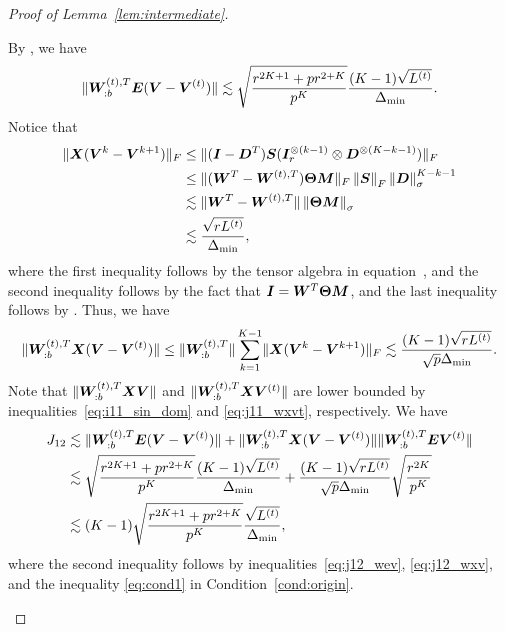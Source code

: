 \documentclass[lettersize,journal]{IEEEtran}
\theoremstyle{definition}
\theoremstyle{definition}
\begin{document}
\begin{proof}[Proof of Lemma~\ref{lem:intermediate}]
\begin{enumerate}
    By \citet[Proof of Lemma 5]{han2020exact}, we have 
    \begin{equation}\label{eq:j12_wev}
        \onormSize{}{\mW_{:b}^{(t),T} \mE (\mV-\mV^{(t)})} \lesssim \sqrt{ \frac{r^{2K+1} + p r^{2 + K}}{p^K} } \frac{(K-1)\sqrt{L^{(t)}}}{\Delta_{\min}}.
    \end{equation}
    Notice that 
    \begin{align}
        \lVert\bm X (\bm{V}^k-\bm{V}^{k+1})\rVert_F &\leq \lVert(\bm I - \bm{D}^T) \bm S (\bm I_r^{\otimes (k-1)} \otimes  \bm{D}^{\otimes (K-k-1)})\rVert_F \\
        &\leq \lVert(\bm{W}^T - \bm{W}^{(t),T}) \boldsymbol{\Theta} \bm M\rVert_F \left\lVert\bm S\right\rVert_F \left\lVert \bm{D}\right\rVert_{\sigma}^{K-k-1}\\
        & \lesssim \lVert \bm{W}^T - \bm{W}^{(t),T} \rVert \left\lVert\boldsymbol{\Theta} \bm M\right\rVert_{\sigma} \\
        & \lesssim \frac{ \sqrt{r L^{(t)}}}{\Delta_{\min}},
    \end{align}
    where the first inequality follows by the tensor algebra in equation~\label{eq:j11_inner}, and the second inequality follows by the fact  that $\bm I = \bm{W}^T \boldsymbol{\Theta} \bm M$, and the last inequality follows by \citet[Proof of Lemma 5]{han2020exact}. Thus, we have
    \begin{equation}
           \onormSize{}{\mW_{:b}^{(t),T} \mX (\mV-\mV^{(t)})}\leq \onormSize{}{\mW_{:b}^{(t),T} }  \sum_{k = 1}^{K-1} \onormSize{}{\mX (\mV^k-\mV^{k+1})}_F \lesssim \frac{ (K-1) \sqrt{r L^{(t)}}}{\sqrt{p} \Delta_{\min}}.\label{eq:j12_wxv}
    \end{equation}
    Note that $\lVert\bm{W}_{:b}^{(t),T} \bm X \bm{V} \rVert$ and $\lVert\bm{W}_{:b}^{(t),T} \bm X \bm{V}^{(t)} \rVert$ are lower bounded by inequalities~\eqref{eq:i11_sin_dom} and \eqref{eq:j11_wxvt}, respectively. We have 
    \begin{align}
        J_{12} &\lesssim \lVert\bm{W}_{:b}^{(t),T} \bm{E} (\bm{V}-\bm{V}^{(t)})\rVert + \lVert\bm{W}_{:b}^{(t),T} \bm X (\bm{V}-\bm{V}^{(t)})\rVert\lVert\bm{W}_{:b}^{(t),T} \bm{E} \bm{V}^{(t)} \rVert\\
        &\lesssim \sqrt{ \frac{r^{2K+1} + p r^{2 + K}}{p^K} } \frac{(K-1)\sqrt{L^{(t)}}}{\Delta_{\min}} + \frac{ (K-1) \sqrt{r L^{(t)}}}{\sqrt{p} \Delta_{\min}} \sqrt{\frac{r^{2K}}{p^K}} \\
        & \lesssim (K-1) \sqrt{ \frac{r^{2K+1} + p r^{2 + K}}{p^K} } \frac{\sqrt{L^{(t)}}}{\Delta_{\min}},
    \end{align}
    where the second inequality follows by inequalities~\eqref{eq:j12_wev}, \eqref{eq:j12_wxv}, and the inequality \eqref{eq:cond1} in Condition~\ref{cond:origin}.
    


\end{enumerate}
\end{proof}
\end{document}

